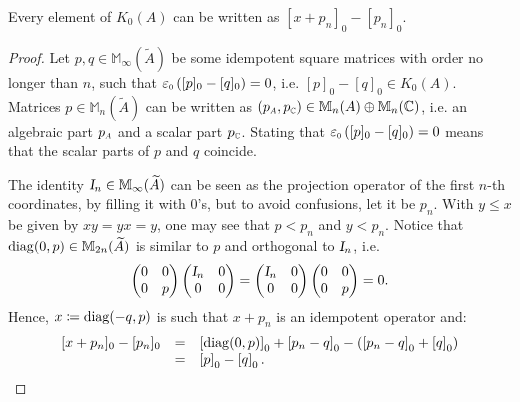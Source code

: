 \begin{proposicao}
Every element of $K_0(A)$ can be written as $[x+p_n]_0-[p_n]_0$.

\begin{proof}
Let $p, q \in \mathbb M_{\infty}(\widetilde A)$ be some idempotent square matrices with order no longer than $n$, such that $\sub\ep0\left([p]_0 - [q]_0\right) = 0$, i.e. $[p]_0 - [q]_0 \in K_0(A)$. Matrices $p \in \mathbb M_n(\widetilde{A})$ can be written as $(\sub pA, \sub p{\C}) \in \mathbb M_n(A)\oplus \mathbb M_n(\C)$, i.e. an algebraic part $\sub pA$ and a scalar part $\sub p{\C}$. Stating that  $\sub\ep0\left([p]_0 - [q]_0\right) = 0$ means that the scalar parts of $p$ and $q$ coincide.

The identity $\textsl{I}_n \in \mathbb M_\infty(\widetilde{A})$ can be seen as the projection operator of the first $n$-th coordinates, by filling it with 0's, but to avoid confusions, let it be $p_n$. With $y\leqslant x$ be given by $xy = yx = y$, one may see that $p < p_n$ and $y < p_n$. Notice that
$\operatorname{diag}(0,p) \in \mathbb M_{2n}(\widetilde{A})$ is similar to $p$ and orthogonal to $\textsl{I}_n$, i.e. 
\[
\begin{pmatrix}
    0 & 0 \\ 0 & p
\end{pmatrix}
\begin{pmatrix}
    \textsl{I}_n & 0 \\ 0 & 0 
\end{pmatrix} = 
\begin{pmatrix}
    \textsl{I}_n & 0 \\ 0 & 0 
\end{pmatrix} \begin{pmatrix}
    0 & 0 \\ 0 & p
\end{pmatrix} = 0.
    \] 
Hence, $x \coloneqq \operatorname{diag}(-q,p)$ is such that $x+p_n$ is an idempotent operator and:
\begin{equation*}
    \begin{array}{rcl}
        [x+p_n]_0 - [p_n]_0 &=& \left[\diag(0,p)\right]_0 + \left[p_n - q\right]_0 - \left(\left[p_n-q\right]_0 + \left[q\right]_0\right) \\
        &=& \left[p\right]_0 - \left[q\right]_0. 
    \end{array}\hfill \qedhere
\end{equation*}
\end{proof}
\end{proposicao}


